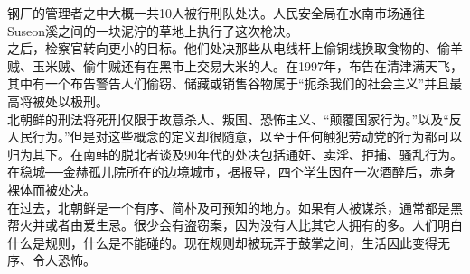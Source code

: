 \begin{multicols}{\theparacolNo}
钢厂的管理者之中大概一共10人被行刑队处决。人民安全局在水南市场通往Suseon溪之间的一块泥泞的草地上执行了这次枪决。\\

之后，检察官转向更小的目标。他们处决那些从电线杆上偷铜线换取食物的、偷羊贼、玉米贼、偷牛贼还有在黑市上交易大米的人。在1997年，布告在清津满天飞，其中有一个布告警告人们偷窃、储藏或销售谷物属于“扼杀我们的社会主义”并且最高将被处以极刑。\\

北朝鲜的刑法将死刑仅限于故意杀人、叛国、恐怖主义、“颠覆国家行为。”以及“反人民行为。”但是对这些概念的定义却很随意，以至于任何触犯劳动党的行为都可以归为其下。在南韩的脱北者谈及90年代的处决包括通奸、卖淫、拒捕、骚乱行为。在稳城──金赫孤儿院所在的边境城市，据报导，四个学生因在一次酒醉后，赤身裸体而被处决。\\

在过去，北朝鲜是一个有序、简朴及可预知的地方。如果有人被谋杀，通常都是黑帮火并或者由爱生忌。很少会有盗窃案，因为没有人比其它人拥有的多。人们明白什么是规则，什么是不能碰的。现在规则却被玩弄于鼓掌之间，生活因此变得无序、令人恐怖。\\
\ifnum{}
	\end{multicols}
\fi